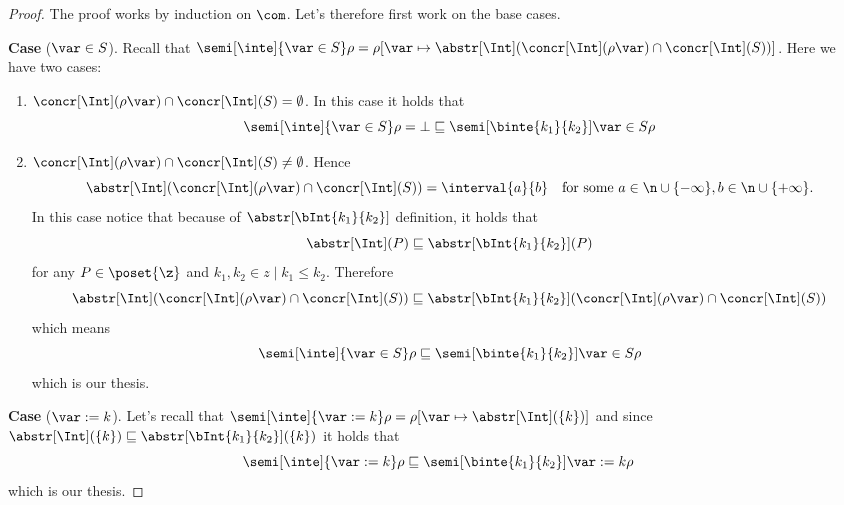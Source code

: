 \begin{proof}
  The proof works by induction on \(\com\). Let's therefore first work
  on the base cases.

  \medskip

  \noindent
  \textbf{Case} (\(\var \in S\)).
  Recall that
  \(\semi[\inte]{\var\in S}\rho = \rho[\var \mapsto
  {\abstr[\Int](\concr[\Int](\rho\var) \cap
    \concr[\Int](S))}]\). Here we have two cases:
  \begin{enumerate}[label=(\arabic*)]
  \item \({\concr[\Int](\rho\var) \cap \concr[\Int](S)} =
    \emptyset\). In this case it holds that
    \begin{equation*}
      \semi[\inte]{\var\in S}\rho = \bot \sqsubseteq \semi[\binte{k_1}{k_2}]{\var\in S}\rho
    \end{equation*}
    
  \item
    \({\concr[\Int](\rho\var) \cap \concr[\Int](S)} \neq \emptyset\).
    Hence
    \begin{equation*}
      \abstr[\Int](\concr[\Int](\rho\var) \cap \concr[\Int](S)) = \interval{a}{b} \quad \text{for some }
      {a \in \n \cup \{-\infty\}}, {b \in \n\cup\{+\infty\}}.
    \end{equation*}
    In
    this case notice that because of \(\abstr[\bInt{k_1}{k_2}]\)
    definition, it holds that
    \begin{equation*}
      \abstr[\Int](P) \sqsubseteq \abstr[\bInt{k_1}{k_2}](P)
    \end{equation*}
    for any \(P \in \poset{\z}\) and
    \(k_1, k_2 \in z \mid k_1 \leq k_2\). Therefore
    \begin{equation*}
      \abstr[\Int](\concr[\Int](\rho\var) \cap \concr[\Int](S)) \sqsubseteq
      \abstr[\bInt{k_1}{k_2}](\concr[\Int](\rho\var) \cap \concr[\Int](S))
    \end{equation*}
    which means
    \begin{equation*}
      {\semi[\inte]{\var\in S}\rho} \sqsubseteq {\semi[\binte{k_1}{k_2}]{\var\in S}\rho}
    \end{equation*}
    which is our thesis.
  \end{enumerate}

  \medskip

  \noindent
  \textbf{Case} (\(\var := k\)).
  Let's recall that
  \({\semi[\inte]{\var := k}\rho = \rho[\var \mapsto
    \abstr[\Int](\{k\})]}\) and since
  \({\abstr[\Int](\{k\})} \sqsubseteq {\abstr[\bInt{k_1}{k_2}](\{k\})}\) it holds
  that
  \begin{equation*}
    \semi[\inte]{\var := k}\rho \sqsubseteq \semi[\binte{k_1}{k_2}]{\var := k}\rho
  \end{equation*}
  which is our thesis.


\end{proof}

